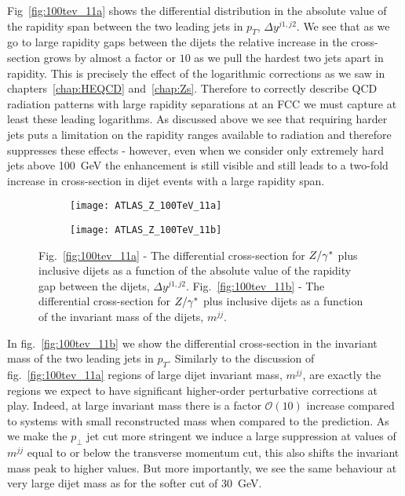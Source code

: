 	Fig~\eqref{fig:100tev_11a} shows the differential distribution in the absolute value of the
	rapidity span between the two leading jets in $p_T$, $\Delta y^{j1, j2}$.  We see that as we go to
	large rapidity gaps between the dijets the relative increase in the cross-section grows by almost a
	factor or $10$ as we pull the hardest two jets apart in rapidity.  This is precisely the effect of
	the logarithmic corrections as we saw in chapters~\ref{chap:HEQCD} and~\ref{chap:Zs}.
	Therefore to correctly describe QCD radiation patterns with large rapidity separations at an FCC
	we must capture at least these leading logarithms.  As discussed above we see that requiring harder
	jets puts a limitation on the rapidity ranges available to radiation and therefore suppresses these
	effects - however, even when we consider only extremely hard jets above 100~GeV the enhancement is
	still visible and still leads to a two-fold increase in cross-section in dijet events with a large
	rapidity span.

	\begin{figure}[bth]
		\centering
		\begin{subfigure}[b]{0.49\textwidth}
			\texttt{[image: ATLAS\_Z\_100TeV\_11a]}
			\caption{}
			\label{fig:100tev_11a}
		\end{subfigure}
		\begin{subfigure}[b]{0.49\textwidth}
			\texttt{[image: ATLAS\_Z\_100TeV\_11b]}
			\caption{}
			\label{fig:100tev_11b}
		\end{subfigure}
		\caption{Fig.~\eqref{fig:100tev_11a} - The differential cross-section for $Z/\gamma^*$ plus inclusive dijets as a function
		of the absolute value of the rapidity gap between the dijets, $\Delta y^{j1, j2}$. Fig.~\eqref{fig:100tev_11b} -
		The differential cross-section for $Z/\gamma^*$ plus inclusive dijets as a function of the invariant mass of the dijets, $m^{jj}$.}
	\end{figure}

	In fig.~\eqref{fig:100tev_11b} we show the differential cross-section in the invariant mass of the two leading
	jets in $p_T$.  Similarly to the discussion of fig.~\eqref{fig:100tev_11a} regions of large dijet invariant mass,
	$m^{jj}$, are exactly the regions we expect to have significant higher-order perturbative corrections at play.
	Indeed, at large invariant mass there is a factor $\mathcal{O}(10)$ increase compared to systems with small
	reconstructed mass when compared to the \stev prediction.  As we make the $p_\perp$ jet cut more stringent
	we induce a large suppression at values of $m^{jj}$ equal to or below the transverse momentum cut, this also
	shifts the invariant mass peak to higher values.  But more importantly, we see the same behaviour at very
	large dijet mass as for the softer cut of 30~GeV.

